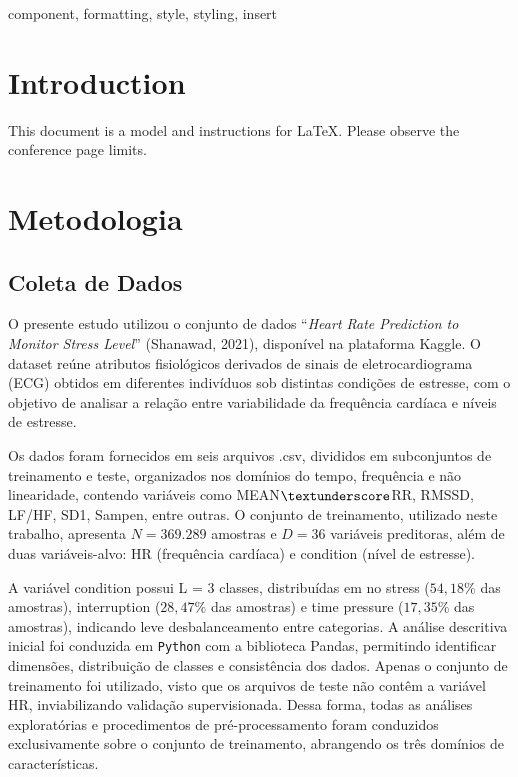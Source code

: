 \documentclass[conference]{IEEEtran}
\begin{document}
\begin{abstract}
This document is a model and instructions for \LaTeX.
This and the IEEEtran.cls file define the components of your paper [title, text, heads, etc.]. *CRITICAL: Do Not Use Symbols, Special Characters, Footnotes, 
or Math in Paper Title or Abstract.
\end{abstract}

\begin{IEEEkeywords}
component, formatting, style, styling, insert
\end{IEEEkeywords}

\section{Introduction}
This document is a model and instructions for \LaTeX.
Please observe the conference page limits. 

\section{Metodologia}

\subsection{Coleta de Dados}

O presente estudo utilizou o conjunto de dados “\textit{Heart Rate Prediction to Monitor Stress Level}” (Shanawad, 2021), disponível na plataforma Kaggle. O dataset reúne atributos fisiológicos derivados de sinais de eletrocardiograma (ECG) obtidos em diferentes indivíduos sob distintas condições de estresse, com o objetivo de analisar a relação entre variabilidade da frequência cardíaca e níveis de estresse.

Os dados foram fornecidos em seis arquivos .csv, divididos em subconjuntos de treinamento e teste, organizados nos domínios do tempo, frequência e não linearidade, contendo variáveis como MEAN$\textunderscore$RR, RMSSD, LF/HF, SD1, Sampen, entre outras. O conjunto de treinamento, utilizado neste trabalho, apresenta $N = 369.289$ amostras e $D = 36$ variáveis preditoras, além de duas variáveis-alvo: HR (frequência cardíaca) e condition (nível de estresse).

A variável condition possui L = 3 classes, distribuídas em no stress ($54,18\%$ das amostras), interruption ($28,47\%$ das amostras) e time pressure ($17,35\%$ das amostras), indicando leve desbalanceamento entre categorias. A análise descritiva inicial foi conduzida em {\tt Python} com a biblioteca Pandas, permitindo identificar dimensões, distribuição de classes e consistência dos dados. Apenas o conjunto de treinamento foi utilizado, visto que os arquivos de teste não contêm a variável HR, inviabilizando validação supervisionada. Dessa forma, todas as análises exploratórias e procedimentos de pré-processamento foram conduzidos exclusivamente sobre o conjunto de treinamento, abrangendo os três domínios de características.
\end{document}
